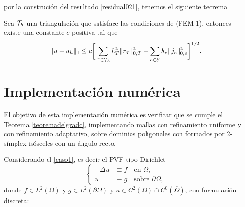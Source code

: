 por la construci\'on del resultado \eqref{residual021}, tenemos el siguiente teorema 
\begin{teorema}\label{teoremadelgrado}
Sea ${\mathcal{T}}_{h}$ una tri\'angulaci\'on que satisface las condiciones de (FEM 1), entonces existe una constante $c$ positiva tal que 
\begin{equation}
\|u-u_{h}\|_{1}\leq c\bigg[ \sum_{T\in{\ensuremath{\mathcal{T}}}_{h}} h^{2}_{T}\| r_{\text{\tiny $T$}} \|^{2}_{0,T}  + \sum_{e\in {\ensuremath{\mathcal{E}}}} h_{e}\|j_{e}\|^{2}_{0,e}  \bigg]^{1/2}.
\end{equation}
\end{teorema}


\section{Implementaci\'on num\'erica}
El objetivo de esta implementaci\'on num\'erica es verificar que se cumple el Teorema \eqref{teoremadelgrado}, implementando mallas con refinamiento uniforme y con refinamiento adaptativo, sobre dominios poligonales con formados por 2-s\'implex is\'osceles con un \'angulo recto. 

Considerando el \eqref{caso1}, es decir el PVF tipo Dirichlet 
\begin{equation*}
\left\{
\begin{aligned}
-\Delta u &\equiv f \quad\text{en } \Omega,\\
u&\equiv g\quad \text{sobre } \partial\Omega,
\end{aligned}
\right.
\end{equation*}
donde $f\in L^{2}(\Omega)$ y $g\in L^{2}(\partial \Omega)$ y $u\in C^{2}(\Omega)\cap C^{0}(\overline{\Omega})$, con formulaci\'on discreta:

